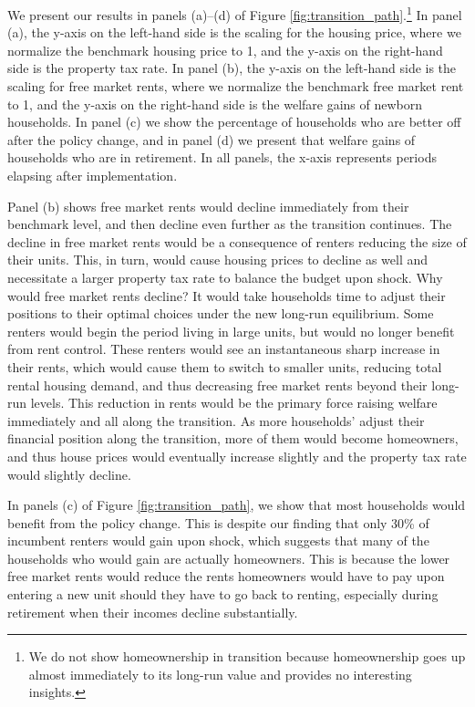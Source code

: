 \documentclass[parskip=full]{article}
\begin{document}
We present our results in panels (a)--(d) of Figure \ref{fig:transition_path}.\footnote{We do not show homeownership in transition because homeownership goes up almost immediately to its long-run value and provides no interesting insights.} In panel (a), the y-axis on the left-hand side is the scaling for the housing price, where we normalize the benchmark housing price to 1, and the y-axis on the right-hand side is the property tax rate. In panel (b), the y-axis on the left-hand side is the scaling for free market rents, where we normalize the benchmark free market rent to 1, and the y-axis on the right-hand side is the welfare gains of newborn households. In panel (c) we show the percentage of households who are better off after the policy change, and in panel (d) we present that welfare gains of households who are in retirement. In all panels, the x-axis represents periods elapsing after implementation.

Panel (b) shows free market rents would decline immediately from their benchmark level, and then decline even further as the transition continues. The decline in free market rents would be a consequence of renters reducing the size of their units. This, in turn, would cause housing prices to decline as well and necessitate a larger property tax rate to balance the budget upon shock. Why would free market rents decline? It would take households time to adjust their positions to their optimal choices under the new long-run equilibrium. Some renters would begin the period living in large units, but would no longer benefit from rent control. These renters would see an instantaneous sharp increase in their rents, which would cause them to switch to smaller units, reducing total rental housing demand, and thus decreasing free market rents beyond their long-run levels. This reduction in rents would be the primary force raising welfare immediately and all along the transition. As more households' adjust their financial position along the transition, more of them would become homeowners, and thus house prices would eventually increase slightly and the property tax rate would slightly decline. 

In panels (c) of Figure \ref{fig:transition_path}, we show that most households would benefit from the policy change. This is despite our finding that only 30\% of incumbent renters would gain upon shock, which suggests that many of the households who would gain are actually homeowners. This is because the lower free market rents would reduce the rents homeowners would have to pay upon entering a new unit should they have to go back to renting, especially during retirement when their incomes decline substantially.
\end{document}
